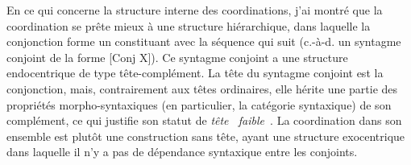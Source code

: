 En ce qui concerne la structure interne des coordinations, j'ai montré que la coordination se prête mieux à une structure hiérarchique, dans laquelle la conjonction forme un constituant avec la séquence qui suit (c.-à-d. un syntagme conjoint de la forme [Conj X]). Ce syntagme conjoint a une structure endocentrique de type tête-complément. La tête du syntagme conjoint est la conjonction, mais, contrairement aux têtes ordinaires, elle hérite une partie des propriétés morpho-syntaxiques (en particulier, la catégorie syntaxique) de son complément, ce qui justifie son statut de \textit{tête {\guillemotleft}~faible~{\guillemotright}}. La coordination dans son ensemble est plutôt une construction sans tête, ayant une structure exocentrique dans laquelle il n'y a pas de dépendance syntaxique entre les conjoints.

